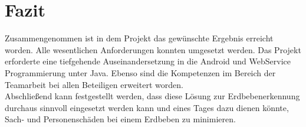 \section{Fazit}
Zusammengenommen ist in dem Projekt das gewünschte Ergebnis erreicht worden. Alle wesentlichen Anforderungen konnten umgesetzt werden. Das Projekt erforderte eine tiefgehende Auseinandersetzung in die Android und WebService Programmierung unter Java. Ebenso sind die Kompetenzen im Bereich der Teamarbeit bei allen Beteiligen erweitert worden.\\
Abschließend kann festgestellt werden, dass diese Lösung zur Erdbebenerkennung durchaus sinnvoll eingesetzt werden kann und eines Tages dazu dienen könnte, Sach- und Personenschäden bei einem Erdbeben zu minimieren.